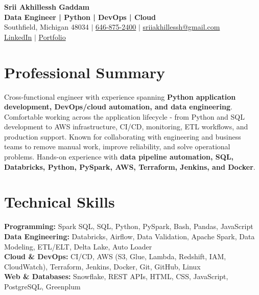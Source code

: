 \documentclass[letterpaper,10pt]{article}
\begin{document}
\fontsize{9.35pt}{10.45pt}\selectfont

\begin{center}
    {\LARGE \textbf{Srii Akhillessh Gaddam}} \\[-1pt]
    \textbf{Data Engineer | Python | DevOps | Cloud} \\[2pt]
    Southfield, Michigan 48034 $|$
    \href{tel:6468752400}{646-875-2400} $|$
    \href{mailto:sriiakhillessh@gmail.com}{sriiakhillessh@gmail.com} \\[1pt]
    \href{https://www.linkedin.com/in/srii-akhiilessh-gaddam-b48668191/}{LinkedIn} $|$
    \href{https://sriiakhillesshg.github.io/portfolio/}{Portfolio}
\end{center}
\vspace{-8pt}

\section{Professional Summary}
\small{Cross-functional engineer with experience spanning \textbf{Python application development, DevOps/cloud automation, and data engineering}. Comfortable working across the application lifecycle - from Python and SQL development to AWS infrastructure, CI/CD, monitoring, ETL workflows, and production support. Known for collaborating with engineering and business teams to remove manual work, improve reliability, and solve operational problems. Hands-on experience with \textbf{data pipeline automation, SQL, Databricks, Python, PySpark, AWS, Terraform, Jenkins, and Docker}.}

\section{Technical Skills}
\small{
\textbf{Programming:} Spark SQL, SQL, Python, PySpark, Bash, Pandas, JavaScript \\
\textbf{Data Engineering:} Databricks, Airflow, Data Validation, Apache Spark, Data Modeling, ETL/ELT, Delta Lake, Auto Loader \\
\textbf{Cloud \& DevOps:} CI/CD, AWS (S3, Glue, Lambda, Redshift, IAM, CloudWatch), Terraform, Jenkins, Docker, Git, GitHub, Linux \\
\textbf{Web \& Databases:} Snowflake, REST APIs, HTML, CSS, JavaScript, PostgreSQL, Greenplum
}

\end{document}

